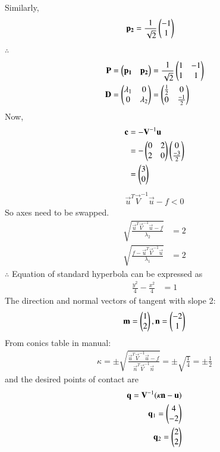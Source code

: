 \documentclass[journal,12pt,twocolumn]{IEEEtran}
\begin{document}
Similarly,
\begin{align}
    \mathbf{p_2} &= \frac{1}{\sqrt{2}}\begin{pmatrix}-1 \\ 1\end{pmatrix}
\end{align}
$\therefore$
\begin{align}
    \mathbf{P} &= \begin{pmatrix}\mathbf{p_1} & \mathbf{p_2}\end{pmatrix} = \frac{1}{\sqrt{2}}\begin{pmatrix}1 & -1 \\ 1 & 1\end{pmatrix}
    \\
    \mathbf{D} &= \begin{pmatrix}\lambda_1 & 0 \\ 0 & \lambda_2\end{pmatrix} = \begin{pmatrix}\frac{1}{2} & 0 \\ 0 & \frac{-1}{2}\end{pmatrix}
\end{align}
Now,
\begin{align}
    \mathbf{c} &= -\mathbf{V}^{-1}\mathbf{u} 
    \\
    &= -\begin{pmatrix}0 & 2 \\2 & 0\end{pmatrix}\begin{pmatrix}0 \\ \frac{-3}{2}\end{pmatrix}
    \\
    &= \begin{pmatrix}3 \\ 0\end{pmatrix}
\end{align}
\begin{align}
\vec{u}^T\vec{V}^{-1}\vec{u} - f<0
\end{align}
So axes need to be swapped.
\begin{align}
    \sqrt{\frac{ \vec{u}^T\vec{V}^{-1}\vec{u} - f}{\lambda_2}} &= 2
    \\
    \sqrt{ \frac{f- \vec{u}^T\vec{V}^{-1}\vec{u}}{\lambda_1}} &= 2
\end{align}
$\therefore$ Equation of standard hyperbola can be expressed as 
\begin{align}
    \frac{y^2}{4} - \frac{x^2}{4} &= 1
\end{align}
The direction and normal vectors of tangent with slope 2:
\begin{align}
    \mathbf{m}=\begin{pmatrix}1\\2\end{pmatrix},\mathbf{n}=\begin{pmatrix}-2\\1\end{pmatrix}
\end{align}
From conics table in manual:
\begin{align}
\kappa = \pm \sqrt{\frac{\vec{u}^T\vec{V}^{-1}\vec{u}-f}{\vec{n}^T\vec{V}^{-1}\vec{n}}} = \pm \sqrt{\frac{1}{4}} = \pm \frac{1}{2}
\end{align}
and the desired points of contact are 
\begin{align}
\mathbf{q}=\mathbf{V}^{-1}(\kappa\mathbf{n}-\mathbf{u})\\
\mathbf{q}_1=\begin{pmatrix}4\\-2\end{pmatrix}\label{eq:9}\\
\mathbf{q}_2=\begin{pmatrix}2\\2\end{pmatrix}\label{eq:10}
\end{align}
\end{document}
